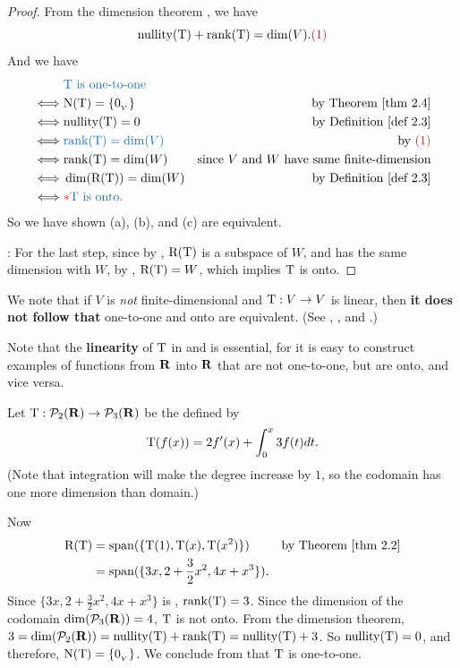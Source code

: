 \begin{proof}
From the dimension theorem , we have
\[
    \nullityT + \rankT = \dim(V). \MAROON{(1)}
\]
And we have
\begin{align*}
         & \BLUE{\T \text{ is one-to-one }} \\
    \iff & \NULLT = \{ \OV \} & \text{by \THM{2.4}} \\
    \iff & \nullityT = 0 & \text{by \DEF{2.3}} \\
    \iff & \BLUE{\rankT = \dim(V)} & \text{by \MAROON{(1)}} \\
    \iff & \rankT = \dim(W) & \text{since \(V\) and \(W\) have same finite-dimension} \\
    \iff & \dim(\RANGET) = \dim(W) & \text{by \DEF{2.3}} \\
    \iff & \RED{*} \BLUE{\T \text{ is onto.}}
\end{align*}
So we have shown (a), (b), and (c) are equivalent.

\RED{*}: For the last step, since by , \(\mathrm{R(T)}\) is a subspace of \(W\), and has the same dimension with \(W\), by , \(\mathrm{R(T)} = W\), which implies \(\mathrm{T}\) is onto.
\end{proof}

\begin{remark} \label{remark 2.1.10}
We note that if \(V\) is \emph{not} finite-dimensional and \(\mathrm{T} : V \to V\) is linear, then \textbf{it does not follow that} one-to-one and onto are equivalent.
(See , , and .)

Note that the \textbf{linearity} of \(\mathrm{T}\) in  and  is essential, for it is easy to construct examples of functions from \(\mathbf{R}\) into \(\mathbf{R}\) that are not one-to-one, but
are onto, and vice versa.
\end{remark}

\begin{example} \label{example 2.1.11}
Let \(\mathrm{T} : \mathcal{P}_2(\mathbf{R}) \to \mathcal{P}_3(\mathbf{R})\) be the \LTRAN{} defined by
\[
    \mathrm{T}(f(x)) = 2f'(x) + \int_0^x 3f(t) dt.
\]
(Note that integration will make the degree increase by \(1\), so the codomain has one more dimension than domain.)

Now
\begin{align*}
    \RANGET & = \spann(\{ \T(1), \T(x), \T(x^2) \}) & \text{by \THM{2.2}} \\
            & = \spann(\{ 3x, 2 + \frac{3}{2} x^2, 4x + x^3 \}).
\end{align*}
Since \(\{ 3x, 2 + \frac{3}{2} x^2, 4x + x^3 \}\) is \LID{}, \(\mathrm{rank}(\mathrm{T}) = 3\).
Since the dimension of the codomain \(\dim(\mathcal{P}_3(\mathbf{R})) = 4\), \(\mathrm{T}\) is not onto.
From the dimension theorem, \(3 = \dim(\mathcal{P}_2(\mathbf{R})) = \mathrm{nullity}(\mathrm{T}) + \mathrm{rank}(\mathrm{T}) = \mathrm{nullity}(\mathrm{T}) + 3\).
So \(\mathrm{nullity}(\mathrm{T}) = 0\), and therefore, \(\mathrm{N(T)} = \{ 0_{_V} \}\).
We conclude from  that \(\mathrm{T}\) is one-to-one.
\end{example}

